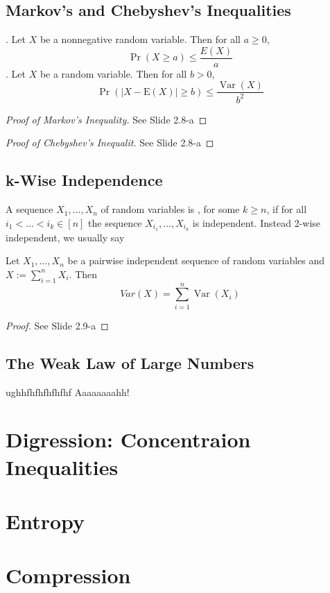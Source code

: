 \subsection{Markov's and Chebyshev's Inequalities}
. Let $X$ be a nonnegative random variable. Then for all $a \geq 0$, 
\begin{equation}
\operatorname{Pr}(X \geq a) \leq \frac{E(X)}{a}
\end{equation}
. Let $X$ be a random variable. Then for all $b > 0$,
\begin{equation}
\operatorname{Pr}(|X-\mathrm{E}(X)| \geq b) \leq \frac{\operatorname{Var}(X)}{b^{2}}
\end{equation}
\begin{proof}[Proof of Markov's Inequality]
	See Slide 2.8-a
\end{proof}
\begin{proof}[Proof of Chebyshev's Inequalit]
	See Slide 2.8-a
\end{proof}
\subsection{k-Wise Independence}
A sequence $X_1,\ldots,X_n$ of random variables is , for some $k \geq n$, if for all $i_1 < \ldots < i_k \in [n]$ the sequence $X_{i_1},\ldots,X_{i_k}$ is independent. Instead 2-wise independent, we usually say 

Let $X_1,\ldots,X_n$ be a pairwise independent sequence of random variables and $X := \sum_{i=1}^{n}X_i$. Then 
\begin{equation}
Var(X) = \sum_{i=1}^n \operatorname{Var}(X_i)
\end{equation}

\begin{proof}
	See Slide 2.9-a
\end{proof}
\subsection{The Weak Law of Large Numbers}
ughhfhfhfhfhfhf Aaaaaaaahh!
\section{Digression: Concentraion Inequalities}
\section{Entropy}
\section{Compression}